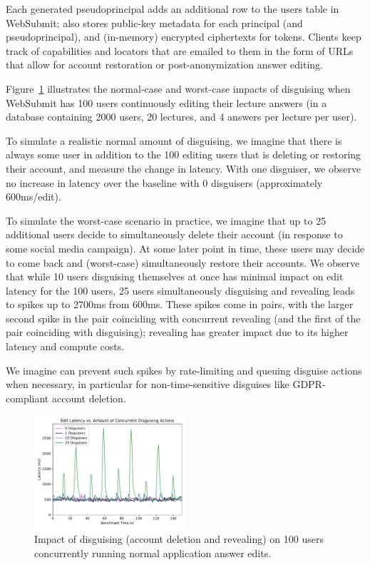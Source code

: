 Each generated pseudoprincipal adds an additional row to the users table in WebSubmit; \sys also stores public-key metadata for each principal (and
pseudoprincipal), and (in-memory) encrypted ciphertexts for tokens.
Clients keep track of capabilities and locators that are emailed to them in the form of URLs that
allow for account restoration or post-anonymization answer editing.

Figure~\ref{fig:concurrent} illustrates the normal-case and worst-case impacts of disguising when
WebSubmit has 100 users continuously editing their lecture answers (in a database containing 2000
users, 20 lectures, and 4 answers per lecture per user).

To simulate a realistic normal amount of disguising, we imagine that there is always some user in
addition to the 100 editing users that is deleting or restoring their account, and measure the
change in latency. With one disguiser, we observe no increase in latency over the baseline with 0
disguisers (approximately 600ms/edit).

To simulate the worst-case scenario in practice, we imagine that up to 25 additional users decide to
simultaneously delete their account (\eg in response to some social media campaign). At some later
point in time, these users may decide to come back and (worst-case) simultaneously restore their
accounts. We observe that while 10 users disguising themselves at once has
minimal impact on edit latency for the 100 users, 25 users simultaneously disguising and
revealing leads to spikes up to 2700ms from 600ms.
These spikes come in pairs, with the larger second spike in the pair coinciding with concurrent
revealing (and the first of the pair coinciding with disguising); revealing has greater impact due
to its higher latency and compute costs.

We imagine \sys can prevent such spikes by rate-limiting and queuing disguise actions when
necessary, in particular for non-time-sensitive disguises like GDPR-compliant account deletion.

\begin{figure}[t!]
    \centering
        \includegraphics[width=0.5\textwidth]{figs/concurrent_results_20lec_100users}
    \caption{Impact of disguising (account deletion and revealing) on 100 users concurrently running
    normal application answer edits.} 
    \label{fig:concurrent}
\end{figure}

